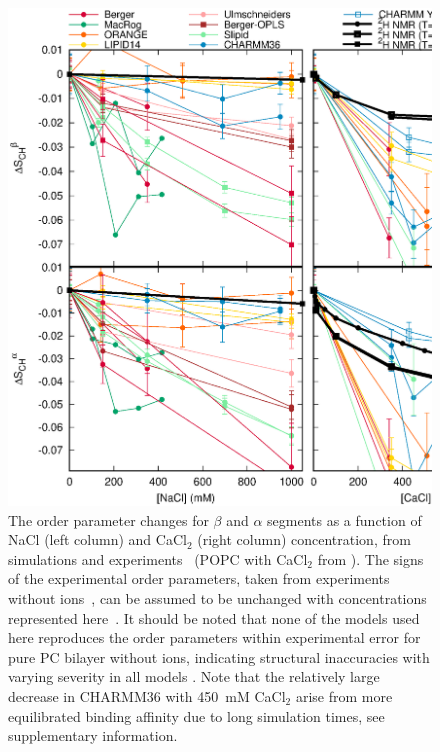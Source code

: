 \documentclass[pre,aps,floatfix,authordate1-4,twocolumn]{revtex4-1}
\begin{document}
\begin{figure}[]
  \centering
  \includegraphics[width=15cm]{../Fig/OrderParameterIONSchanges.eps}
  \caption{\label{ordPions}
    The order parameter changes for $\beta$ and $\alpha$ segments as a function of NaCl (left column) 
    and CaCl$_2$ (right column) concentration, from simulations and experiments~\cite{akutsu81} 
    (POPC with CaCl$_2$ from \cite{altenbach84}). The signs of the experimental order parameters, taken from
    experiments without ions~\cite{hong95a,hong95b,gross97}, can be assumed to be unchanged 
    with concentrations represented here~\cite{altenbach84,ollila16}. 
    It should be noted that none of the models used here reproduces the order parameters
    within experimental error for pure PC bilayer without ions, indicating structural inaccuracies with varying severity in all
    models \cite{botan15}. %
    Note that the relatively large decrease in CHARMM36 with 450~mM CaCl$_2$ arise from more equilibrated binding 
    affinity due to long simulation times, see supplementary information.
  }
\end{figure}
\end{document}
